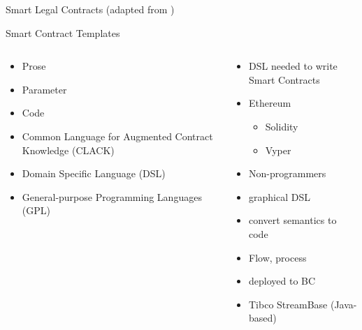 \documentclass[pdf,table]{beamer}
\begin{document}
\begin{frame}{Smart Legal Contracts (adapted from \cite{grigg2015ricardian})}
	\centering
\end{frame}

\begin{frame}{Smart Contract Templates \cite{clack2016smart,clack2016asmart} }
	\begin{columns}[T]
		\begin{column}{0.48\textwidth}
			\begin{itemize}
				\item Prose
				\item Parameter
				\item Code
				\item Common Language for Augmented Contract Knowledge (CLACK)
				\item Domain Specific Language (DSL)
				\item General-purpose Programming Languages (GPL)
				
			\end{itemize}
		\end{column}
		\begin{column}{0.48\textwidth}
			\begin{itemize}
				\item DSL needed to write Smart Contracts
				\item Ethereum
					\begin{itemize}
						\item Solidity
						\item Vyper
					\end{itemize}
				\item Non-programmers
				\item graphical DSL
				\item convert semantics to code
				\item Flow, process
				\item deployed to BC
				\item Tibco StreamBase (Java-based)
			\end{itemize}
		\end{column}
	\end{columns}	
\end{frame}
\end{document}
